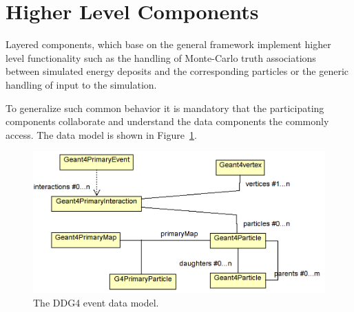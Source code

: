 \documentclass[10pt,a4paper]{article}
\begin{document}
\newpage
\section{Higher Level Components}
\label{sec:ddg4-implementation-higher-level-components}
\noindent
Layered components, which base on the general framework implement higher 
level functionality such as the handling of Monte-Carlo truth associations
between simulated energy deposits and the corresponding particles or the
generic handling of input to the simulation.

\noindent
To generalize such common behavior it is mandatory that the participating
components collaborate and understand the data components the commonly access.
The data model is shown in Figure~\ref{fig:ddg4-event-data-model}.
\begin{figure}[t]
  \begin{center}
    \includegraphics[width=120mm] {DDG4_event_data_model.png}
    \caption{The DDG4 event data model.}
    \label{fig:ddg4-event-data-model}
  \end{center}
\end{figure}
\end{document}
